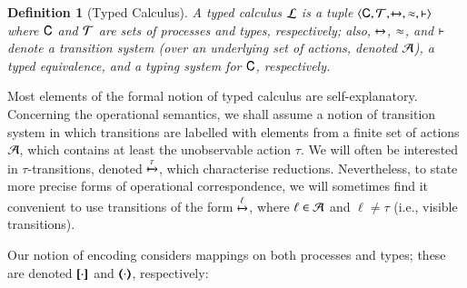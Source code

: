 \documentclass[preprint,11pt]{elsarticle}
\newtheorem{definition}{Definition}[section]
\begin{document}
{{%

\begin{definition}[Typed Calculus]\label{d:tcalculus}%
	A \emph{typed calculus} $\mathcal{L}$ is a tuple
	$\langle \mathsf{C}, \cal{T}, \xmapsto{~}, \approx, \vdash \rangle$
	where $\mathsf{C}$ and $\cal{T}$ are sets of processes and types, 
	respectively; also, $\xmapsto{}$, $\approx$, and $\vdash$ 
	denote a transition system (over an underlying set of actions, denoted $\cal{A}$), a typed equivalence,
	and a typing system for $\mathsf{C}$, respectively. 
\end{definition}

%
%
%
%


Most elements of the formal notion of typed calculus are self-explanatory. 
Concerning the operational semantics, we shall assume a notion of transition system in which transitions are labelled with 
elements from a finite set of actions $\cal{A}$, which contains at least the unobservable action $\tau$. 
We will often be interested in $\tau$-transitions, denoted $\xmapsto{\tau}$, which characterise reductions. 
Nevertheless, to state more precise forms of operational correspondence, we 
will sometimes find it convenient to use transitions of 
the form $\xmapsto{\ell}$,
where $\ell \in \cal{A}$ and $\ell \neq \tau$ (i.e., visible transitions). 

Our notion of encoding considers mappings on both processes 
and types; these are denoted $[\!\![\cdot]\!\!]$ and $(\!\!\langle\cdot\rangle\!\!)$, respectively: %

}}
\end{document}
